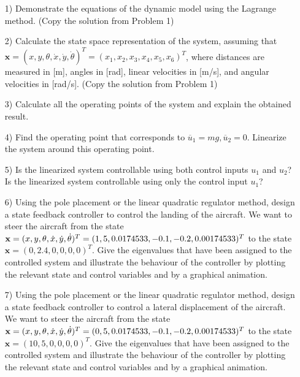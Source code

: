 \documentclass{article}
\begin{document}
\begin{itemize}

\item[1)] Demonstrate the equations of the dynamic model using the Lagrange method. (Copy the solution from Problem 1)

\item[2)] Calculate the state space representation of the system, assuming that $\mathbf{x} = (x, y, \theta, \dot{x}, \dot{y}, \dot{\theta})^T = ( x_1, x_2, x_3, x_4, x_5, x_6)^T$, where
distances are measured in [m], angles in [rad], linear velocities in [m/s], and angular velocities in [rad/s]. 
(Copy the solution from Problem 1)

\item[3)] Calculate all the operating points of the system and explain the obtained result.

\item[4)] Find the operating point that corresponds to $\overline{u}_1 = m g, \overline{u}_2 = 0$. Linearize the system around this operating point.

\item[5)] 
Is the linearized system controllable using both control inputs  $u_1$ and $u_2$? 
Is the linearized system controllable using only the control input $u_1$? 

\item[6)] Using the pole placement or the linear quadratic regulator method, design a state feedback controller to control the landing of the aircraft. 
We want to steer the aircraft from the state $\mathbf{x} = (x, y, \theta, \dot{x}, \dot{y}, \dot{\theta})^T = (1,5,0.0174533,-0.1,\linebreak -0.2,0.00174533)^T$ to the state $\mathbf{x} = (0, 2.4, 0, 0, 0, 0)^T$. 
Give the eigenvalues that have been assigned to the controlled system and illustrate the behaviour of the controller by plotting the relevant state and control variables and by a graphical animation. 


\item[7)] Using the pole placement or the linear quadratic regulator method, design a state feedback controller to control a lateral displacement of the aircraft. 
We want to steer the aircraft from the state $\mathbf{x} = (x, y, \theta, \dot{x}, \dot{y}, \dot{\theta})^T = (0,5,0.0174533,\linebreak -0.1,-0.2,0.00174533)^T$ to the state $\mathbf{x} = (10, 5, 0, 0, 0, 0)^T$. 
Give the eigenvalues that have been assigned to the controlled system and illustrate the behaviour of the controller by plotting the relevant state and control variables and by a graphical animation. 


\end{itemize}
\end{document}
